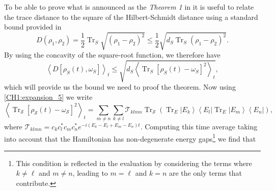 To be able to prove what is announced as the \textit{Theorem 1} in \cite{linden_quantum_2009}
it is useful to relate the trace distance to the square of the Hilbert-Schmidt distance using a standard bound provided in \cite{fuchs_cryptographic_1999}
\begin{equation}
D\left(\rho_{1}, \rho_{2}\right)=\frac{1}{2} \operatorname{Tr}_{S} \sqrt{\left(\rho_{1}-\rho_{2}\right)^{2}} \leq \frac{1}{2} \sqrt{d_{S} \operatorname{Tr}_{S}\left(\rho_{1}-\rho_{2}\right)^{2}}.
\label{CH1:Linden_proof_1}
\end{equation}
By using the concavity of the square-root function, we therefore have
\begin{equation}
\left\langle D\left[\rho_{S}(t), \omega_{S}\right]\right\rangle_{t} \leq \sqrt{d_{S}\left\langle\operatorname{Tr}_{S}\left[\rho_{S}(t)-\omega_{S}\right]^{2}\right\rangle_{t}},
\label{CH1:Linden_proof_2}
\end{equation}
which will provide us the bound we need to proof the theorem. Now using \eqref{CH1:expansion_5} we write
\begin{equation}
\left\langle\operatorname{Tr}_{\mathcal{S}}\left[\rho_{\mathcal{S}}(t)-\omega_{\mathcal{S}}\right]^{2}\right\rangle_{t}=\sum_{m \neq n} \sum_{k \neq l} \mathcal{T}_{k l m n} \operatorname{Tr}_{\mathcal{S}}\left(\operatorname{Tr}_{E}\left|E_{k}\right\rangle\left\langle E_{l}\left|\operatorname{Tr}_{E}\right| E_{m}\right\rangle\left\langle E_{n}\right|\right),
\end{equation}
where $\mathcal{T}_{k l m n}=c_{k} c_{l}^{*} c_{m} c_{n}^{*} e^{-i\left(E_{k}-E_{l}+E_{m}-E_{n}\right) t}$. Computing this time average taking into account that the Hamiltonian has non-degenerate energy gaps\footnote{This condition is reflected in the evaluation by considering the terms where $k\neq\ell$ and $m\neq n$, leading to $m=\ell$ and $k=n$ are the only terms that contribute.} we find  that

